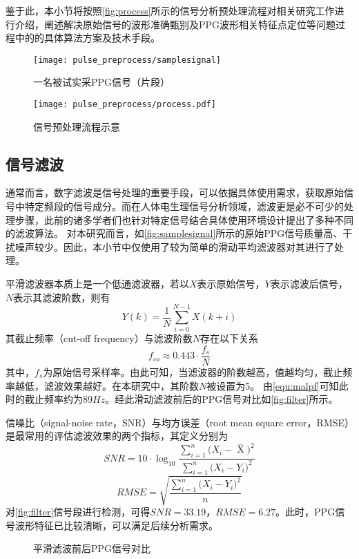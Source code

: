 鉴于此，本小节将按照\autoref{fig:process}所示的信号分析预处理流程对相关研究工作进行介绍，阐述解决原始信号的波形准确甄别及PPG波形相关特征点定位等问题过程中的的具体算法方案及技术手段。
\begin{figure}[htbp]
    \centering
    \texttt{[image: pulse\_preprocess/samplesignal]}
    \caption{\label{fig:samplesignal}一名被试实采PPG信号（片段）}
\end{figure}
\begin{figure}[htbp]
    \centering
    \texttt{[image: pulse\_preprocess/process.pdf]}
    \caption{\label{fig:process}信号预处理流程示意}
\end{figure}

\subsection{信号滤波}
通常而言，数字滤波是信号处理的重要手段，可以依据具体使用需求，获取原始信号中特定频段的信号成分。而在人体电生理信号分析领域，滤波更是必不可少的处理步骤，此前的诸多学者们也针对特定信号结合具体使用环境设计提出了多种不同的滤波算法。
对本研究而言，如\autoref{fig:samplesignal}所示的原始PPG信号质量高、干扰噪声较少。因此，本小节中仅使用了较为简单的滑动平均滤波器对其进行了处理。

平滑滤波器本质上是一个低通滤波器，若以$X$表示原始信号，$Y$表示滤波后信号，$N$表示其滤波阶数，则有
\begin{equation}
    \label{equ:filter}
    Y(k)=\frac{1}{N}\sum_{i=0}^{N-1}X(k+i)
\end{equation}
其截止频率（cut-off frequency）与滤波阶数$N$存在以下关系\cite{malp2011,malp2022}
\begin{equation}
    \label{equ:malpf}
    f_{co} \approx 0.443 \cdot \frac{f_s}{N}    
\end{equation}
其中，$f_s$为原始信号采样率。由此可知，当滤波器的阶数越高，值越均匀，截止频率越低，滤波效果越好。在本研究中，其阶数$N$被设置为5。
由\autoref{equ:malpf}可知此时的截止频率约为89$Hz$。经此滑动滤波前后的PPG信号对比如\autoref{fig:filter}所示。

信噪比（signal-noise rate，SNR）与均方误差（root mean square error，RMSE）是最常用的评估滤波效果的两个指标，其定义分别为
\begin{equation}
    \label{equ:snr}
    SNR=10 \cdot \log_{10}\frac{\sum_{i=1}^{n}{(X_i-\mathop{X} \limits^-})^2}{\sum_{i=1}^{n}{(X_i-Y_i})^2}
\end{equation}
\begin{equation}
    \label{equ:rmse}
    RMSE=\sqrt{\frac{\sum_{i=1}^{n}{(X_i-Y_i})^2}{n}}
\end{equation}
对\autoref{fig:filter}信号段进行检测，可得$SNR=33.19$，$RMSE=6.27$。此时，PPG信号波形特征已比较清晰，可以满足后续分析需求。
\begin{figure}[htbp]
    \centering
    \quad
    \caption{\label{fig:filter}平滑滤波前后PPG信号对比}
\end{figure}

